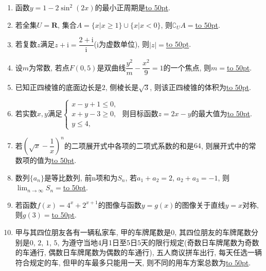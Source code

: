 \documentclass[10pt,a4paper]{article}
\newcommand{\blank}[1]{\underline{\hbox to #1pt{}}}
\begin{document}
\begin{enumerate}[1.]

\item 函数$y=1-2\sin^2(2x)$的最小正周期是\blank{50}.
\item 若全集$U=\mathbf{R}$, 集合$A=\{x|x\ge 1\}\cup\{x|x<0\}$, 则$\complement_U A=$\blank{50}.
\item 若复数$z$满足$z+\mathrm{i}=\dfrac{2+\mathrm{i}}{\mathrm{i}}$($\mathrm{i}$为虚数单位), 则$|z|=$\blank{50}.
\item 设$m$为常数, 若点$F(0,5)$是双曲线$\dfrac{y^2}m-\dfrac{x^2}9=1$的一个焦点, 则$m=$\blank{50}.
\item 已知正四棱锥的底面边长是$2$, 侧棱长是$\sqrt3$, 则该正四棱锥的体积为\blank{50}.
\item 若实数$x,y$满足$\begin{cases} x-y+1 \le 0, \\ x+y-3 \ge 0, \\ y\le 4,\end{cases}$ 则目标函数$z=2x-y$的最大值为\blank{50}.
\item 若$(\sqrt x-\dfrac1x)^n$的二项展开式中各项的二项式系数的和是$64$, 则展开式中的常数项的值为\blank{50}.
\item 数列$\{a_n\}$是等比数列, 前n项和为$S_n$, 若$a_1+a_2=2$, $a_2+a_3=-1$, 则$\displaystyle\lim_{n\to\infty}{S_n}=$\blank{50}.
\item 若函数$f(x)=4^x+2^{x+1}$的图像与函数$y=g(x)$的图像关于直线$y=x$对称, 则$g(3)=$\blank{50}.
\item 甲与其四位朋友各有一辆私家车, 甲的车牌尾数是$0$, 其四位朋友的车牌尾数分别是$0$, $2$, $1$, $5$, 为遵守当地4月1日至5日$5$天的限行规定(奇数日车牌尾数为奇数的车通行, 偶数日车牌尾数为偶数的车通行), 五人商议拼车出行, 每天任选一辆符合规定的车, 但甲的车最多只能用一天, 则不同的用车方案总数为\blank{50}.



\end{enumerate}
\end{document}
